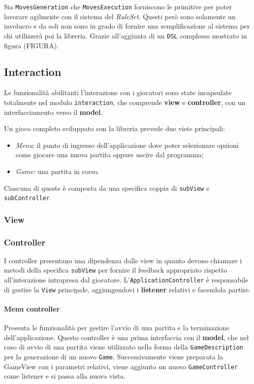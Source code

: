 Sia \texttt{MovesGeneration} che \texttt{MovesExecution} forniscono le primitive per poter lavorare agilmente con il sistema del \textit{RuleSet}.
%
Questi però sono solamente un involucro e da soli non sono in grado di fornire una semplificazione al sistema per chi utilizzerà poi la libreria.
%
Grazie all'aggiunta di un \texttt{DSL} complesso mostrato in figura (FIGURA).

\subsection{Interaction}

Le funzionalità abilitanti l'interazione con i giocatori sono state incapsulate totalmente nel modulo \texttt{interaction}, che comprende \textbf{view} e \textbf{controller}, con un interfacciamento verso il \textbf{model}.

Un gioco completo sviluppato con la libreria prevede due viste principali:
\begin{itemize}
    \item \textit{Menu}: il punto di ingresso dell'applicazione dove poter selezionare opzioni come giocare una nuova partita oppure uscire dal programma;
    \item \textit{Game}: una partita in corso.
\end{itemize}
%
Ciascuna di queste è composta da una specifica coppia di \texttt{subView} e \texttt{subController}.
%

\subsubsection{View}
\subsubsection{Controller}
I controller presentano una dipendenza dalle view in quanto devono chiamare i metodi della specifica \texttt{subView} per fornire il feedback appropriato rispetto all'interazione intrapresa dal giocatore.
%
L'\texttt{ApplicationController} è responsabile di gestire la \texttt{View} principale, aggiungendovi i \textbf{listener} relativi e facendola partire.
\paragraph{Menu controller}
%
Presenta le funzionalità per gestire l'avvio di una partita e la terminazione dell'applicazione.
%
Questo controller è una prima interfaccia con il \textbf{model}, che nel caso di avvio di una partita viene utilizzato nella forma della \texttt{GameDescription} per la generazione di un nuovo \texttt{Game}.
%
Successivamente viene preparata la GameView con i parametri relativi, viene aggiunto un nuovo \texttt{GameController} come listener e si passa alla nuova vista.
